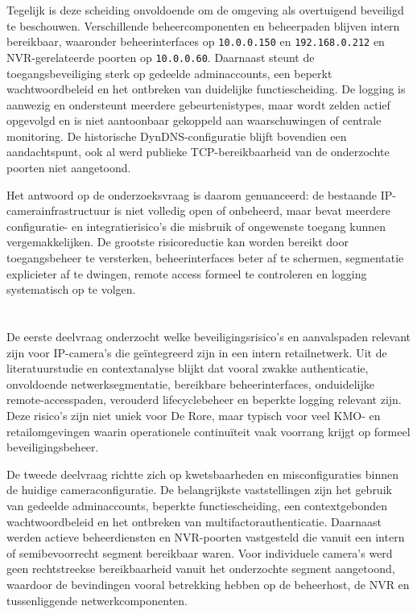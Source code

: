 Tegelijk is deze scheiding onvoldoende om de omgeving als overtuigend beveiligd te beschouwen. Verschillende beheercomponenten en beheerpaden blijven intern bereikbaar, waaronder beheerinterfaces op \texttt{10.0.0.150} en \texttt{192.168.0.212} en NVR-gerelateerde poorten op \texttt{10.0.0.60}. Daarnaast steunt de toegangsbeveiliging sterk op gedeelde adminaccounts, een beperkt wachtwoordbeleid en het ontbreken van duidelijke functiescheiding. De logging is aanwezig en ondersteunt meerdere gebeurtenistypes, maar wordt zelden actief opgevolgd en is niet aantoonbaar gekoppeld aan waarschuwingen of centrale monitoring. De historische DynDNS-configuratie blijft bovendien een aandachtspunt, ook al werd publieke TCP-bereikbaarheid van de onderzochte poorten niet aangetoond.

Het antwoord op de onderzoeksvraag is daarom genuanceerd: de bestaande IP-camerainfrastructuur is niet volledig open of onbeheerd, maar bevat meerdere configuratie- en integratierisico's die misbruik of ongewenste toegang kunnen vergemakkelijken. De grootste risicoreductie kan worden bereikt door toegangsbeheer te versterken, beheerinterfaces beter af te schermen, segmentatie explicieter af te dwingen, remote access formeel te controleren en logging systematisch op te volgen.

\section{}%
\label{sec:conclusie-deelvragen}

De eerste deelvraag onderzocht welke beveiligingsrisico's en aanvalspaden relevant zijn voor IP-camera's die geïntegreerd zijn in een intern retailnetwerk. Uit de literatuurstudie en contextanalyse blijkt dat vooral zwakke authenticatie, onvoldoende netwerksegmentatie, bereikbare beheerinterfaces, onduidelijke remote-accesspaden, verouderd lifecyclebeheer en beperkte logging relevant zijn. Deze risico's zijn niet uniek voor De Rore, maar typisch voor veel KMO- en retailomgevingen waarin operationele continuïteit vaak voorrang krijgt op formeel beveiligingsbeheer.

De tweede deelvraag richtte zich op kwetsbaarheden en misconfiguraties binnen de huidige cameraconfiguratie. De belangrijkste vaststellingen zijn het gebruik van gedeelde adminaccounts, beperkte functiescheiding, een contextgebonden wachtwoordbeleid en het ontbreken van multifactorauthenticatie. Daarnaast werden actieve beheerdiensten en NVR-poorten vastgesteld die vanuit een intern of semibevoorrecht segment bereikbaar waren. Voor individuele camera's werd geen rechtstreekse bereikbaarheid vanuit het onderzochte segment aangetoond, waardoor de bevindingen vooral betrekking hebben op de beheerhost, de NVR en tussenliggende netwerkcomponenten.

